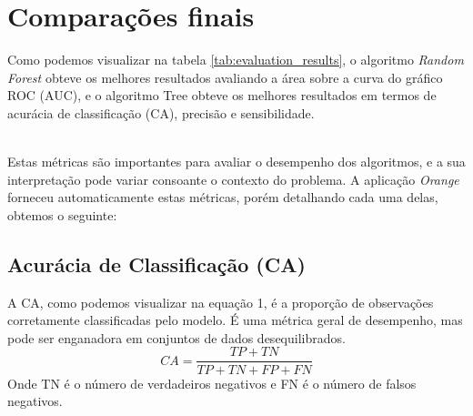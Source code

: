 \documentclass[conference]{IEEEtran}
\begin{document}
\section{Comparações finais}
Como podemos visualizar na tabela \ref{tab:evaluation_results}, o algoritmo \textit{Random Forest} obteve os melhores resultados avaliando a área sobre
a curva do gráfico ROC (AUC), e o algoritmo Tree obteve os melhores resultados em termos de acurácia de classificação (CA), precisão e sensibilidade.
\begin{table}[!ht]
	\centering
	\label{tab:evaluation_results}
	\caption{Comparação de Resultados dos Algoritmos}
\end{table}
\\

Estas métricas são importantes para avaliar o desempenho dos algoritmos, e a sua interpretação pode variar consoante o contexto do problema.
A aplicação \textit{Orange} forneceu automaticamente estas métricas, porém detalhando cada uma delas, obtemos o seguinte:
\subsection{Acurácia de Classificação (CA)}
A CA, como podemos visualizar na equação 1, é a proporção de observações corretamente classificadas pelo modelo. É uma métrica geral de desempenho, mas pode ser enganadora em conjuntos de dados
desequilibrados.
\begin{equation}
	CA = \frac{TP + TN}{TP + TN + FP + FN}
\end{equation}
Onde TN é o número de verdadeiros negativos e FN é o número de falsos negativos.
\end{document}
